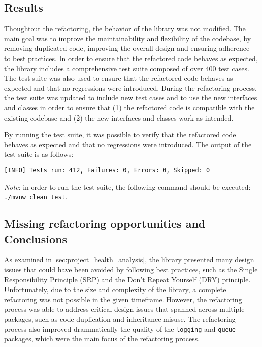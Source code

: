 
\subsection{Results}

Thoughtout the refactoring, the behavior of the library was not modified. The main goal was to improve the maintainability and flexibility of the codebase, by removing duplicated code, improving the overall design and ensuring adherence to best practices. In order to ensure that the refactored code behaves as expected, the library includes a comprehensive test suite composed of over 400 test cases. The test suite was also used to ensure that the refactored code behaves as expected and that no regressions were introduced. During the refactoring process, the test suite was updated to include new test cases and to use the new interfaces and classes in order to ensure that (1) the refactored code is compatible with the existing codebase and (2) the new interfaces and classes work as intended.

By running the test suite, it was possible to verify that the refactored code behaves as expected and that no regressions were introduced. The output of the test suite is as follows:


\begin{center}
	\begin{minipage}{0.7\linewidth}
		\begin{verbatim}
[INFO] Tests run: 412, Failures: 0, Errors: 0, Skipped: 0
    \end{verbatim}
	\end{minipage}
\end{center}

\noindent \textit{Note}: in order to run the test suite, the following command should be executed: \texttt{./mvnw clean test}.

\subsection{Missing refactoring opportunities and Conclusions}

As examined in \autoref{sec:project_health_analysis}, the library presented many design issues that could have been avoided by following best practices, such as the \href{https://en.wikipedia.org/wiki/Single_responsibility_principle}{Single Responsibility Principle} (SRP) and the \href{https://en.wikipedia.org/wiki/Don%27t_repeat_yourself}{Don't Repeat Yourself} (DRY) principle. Unfortunately, due to the size and complexity of the library, a complete refactoring was not possible in the given timeframe. However, the refactoring process was able to address critical design issues that spanned across multiple packages, such as code duplication and inheritance misuse. The refactoring process also improved drammatically the quality of the \texttt{logging} and \texttt{queue} packages, which were the main focus of the refactoring process.

